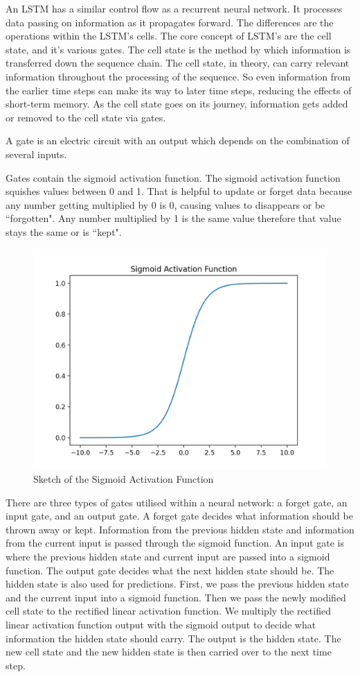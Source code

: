 An LSTM has a similar control flow as a recurrent neural network. It processes data passing on information as it propagates forward. The differences are the operations within the LSTM’s cells. The core concept of LSTM’s are the cell state, and it’s various gates. The cell state is the method by which information is transferred down the sequence chain. The cell state, in theory, can carry relevant information throughout the processing of the sequence. So even information from the earlier time steps can make its way to later time steps, reducing the effects of short-term memory. As the cell state goes on its journey, information gets added or removed to the cell state via gates\cite{lstm_rnn}.

\begin{definition}
A gate is an electric circuit with an output which depends on the combination of several inputs.
\end{definition}

Gates contain the sigmoid activation function. The sigmoid activation function squishes values between 0 and 1. That is helpful to update or forget data because any number getting multiplied by 0 is 0, causing values to disappears or be ``forgotten". Any number multiplied by 1 is the same value therefore that value stays the same or is ``kept".

\begin{figure}[H]
    \centering
    \includegraphics[width=.65\linewidth]{Images/sigmoid.png}
    \caption{Sketch of the Sigmoid Activation Function}
\end{figure}

There are three types of gates utilised within a neural network: a forget gate, an input gate, and an output gate. A forget gate decides what information should be thrown away or kept. Information from the previous hidden state and information from the current input is passed through the sigmoid function. An input gate is where the previous hidden state and current input are passed into a sigmoid function. The output gate decides what the next hidden state should be. The hidden state is also used for predictions. First, we pass the previous hidden state and the current input into a sigmoid function. Then we pass the newly modified cell state to the rectified linear activation function. We multiply the rectified linear activation function output with the sigmoid output to decide what information the hidden state should carry. The output is the hidden state. The new cell state and the new hidden state is then carried over to the next time step\cite{lstm_rnn}.

